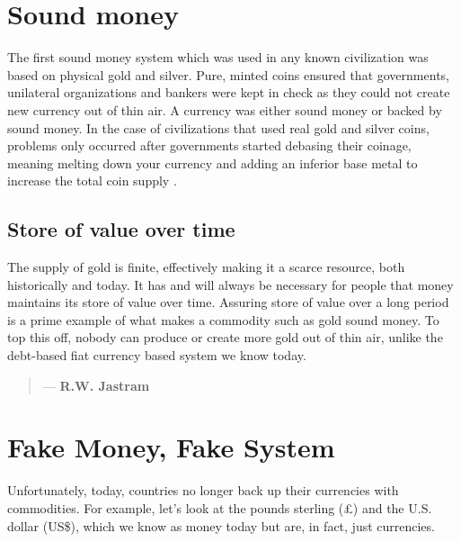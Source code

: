 \section{Sound money}
The first sound money system which was used in any known civilization was based on physical gold and silver. Pure, minted coins ensured that governments, unilateral organizations and bankers were kept in check as they could not create new currency out of thin air. A currency was either sound money or backed by sound money. In the case of civilizations that used real gold and silver coins, problems only occurred after  governments started  debasing their coinage, meaning melting down your currency and adding an inferior base metal to increase the total coin supply \cite{goldsilver ep2}.


\subsection{Store of value over time}

The supply of gold is finite, effectively making it a scarce resource, both historically and today. It has and will always be necessary for people that money maintains its store of value over time. Assuring store of value over a long period is a prime example of what makes a commodity such as gold sound money. To top this off, nobody can produce or create more gold out of thin air, unlike the debt-based fiat currency based system we know today.

\begin{quotation}

      \textit{}
      \begin{flushright}
        \small{--- \textbf{R.W. Jastram}}
      \end{flushright}
    
\end{quotation}

\section{Fake Money, Fake System}
Unfortunately, today, countries no longer back up their currencies with commodities. For example, let's look at the pounds sterling (\pounds) and the U.S. dollar (US\$), which we know as money today but are, in fact, just currencies.\medskip


